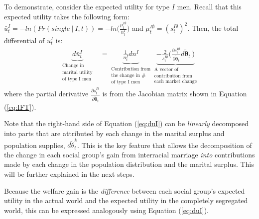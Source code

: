 To demonstrate, consider the expected utility for type $I$ men. Recall that this expected utility takes the following form: $\bar{u}_t^I = - ln(Pr(single \: | \: I,t)) = -ln \Big( \frac{\mu_t^{I\emptyset}}{n_t^I} \Big)$ and $\mu_t^{I\emptyset} = (s_t^{I\emptyset})^2$. Then, the total differential of $\bar{u}_t^I$ is:
\begin{align}
	\underbrace{d\bar{u}_t^I}_{\substack{\text{Change in } \\ \text{marital utility}  \\ \text{of type I men}}} &= \underbrace{\frac{1}{n_t^I}dn^I}_{\substack{\text{Contribution from} \\ \text{the change in \#}  \\ \text{of type I men}}}  \underbrace{- \frac{2}{s_t^{I\emptyset}} \Big(  \frac{\partial s_t^{I\emptyset} }{\partial \tilde{\boldsymbol{\theta}}_t} d \tilde{\boldsymbol{\theta}}_t\  \Big)}_{\substack{\text{A vector of} \\ \text{contribution from}  \\ \text{each market change}}} \label{eq:duI}
\end{align}
where the partial derivative $ \frac{\partial s^{I\emptyset}_t }{\partial \tilde{\boldsymbol{\theta}}_t}$ is from the Jacobian matrix shown in Equation (\ref{eq:IFT}). 

Note that the right-hand side of Equation (\ref{eq:duI}) can be \textit{linearly} decomposed into parts that are attributed by each change in the marital surplus and population supplies, $d\tilde{\theta}^k_t$. This is the key feature that allows the decomposition of the change in each social group's gain from interracial marriage \textit{into} contributions made by each change in the population distribution and the marital surplus. This will be further explained in the next steps. 


Because the welfare gain is the \textit{difference} between each social group's expected utility in the actual world and the expected utility in the completely segregated world, this can be expressed analogously using Equation (\ref{eq:duI}).  



